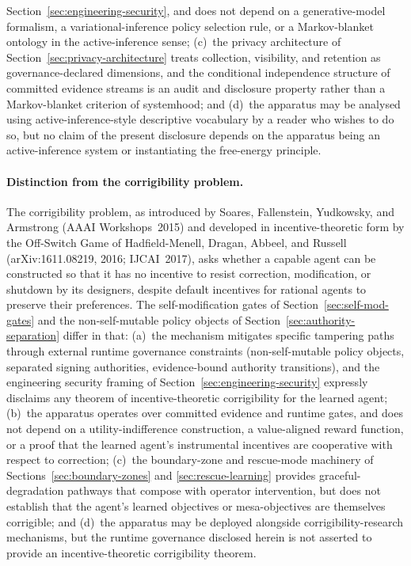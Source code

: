 \documentclass[a4paper,12pt]{article}
\begin{document}
Section~\ref{sec:engineering-security}, and does not depend on a
generative-model formalism, a variational-inference policy
selection rule, or a Markov-blanket ontology in the
active-inference sense; (c)~the privacy architecture of
Section~\ref{sec:privacy-architecture} treats collection,
visibility, and retention as governance-declared dimensions, and
the conditional independence structure of committed evidence
streams is an audit and disclosure property rather than a
Markov-blanket criterion of systemhood; and (d)~the apparatus
may be analysed using active-inference-style descriptive
vocabulary by a reader who wishes to do so, but no claim of the
present disclosure depends on the apparatus being an
active-inference system or instantiating the free-energy
principle.

\paragraph{Distinction from the corrigibility problem.}
The corrigibility problem, as introduced by Soares, Fallenstein,
Yudkowsky, and Armstrong (AAAI Workshops~2015) and developed in
incentive-theoretic form by the Off-Switch Game of
Hadfield-Menell, Dragan, Abbeel, and Russell (arXiv:1611.08219,
2016; IJCAI~2017), asks whether a capable agent can be
constructed so that it has no incentive to resist correction,
modification, or shutdown by its designers, despite default
incentives for rational agents to preserve their preferences.
The self-modification gates of Section~\ref{sec:self-mod-gates}
and the non-self-mutable policy objects of
Section~\ref{sec:authority-separation} differ in that:
(a)~the mechanism mitigates specific tampering paths through
external runtime governance constraints (non-self-mutable policy
objects, separated signing authorities, evidence-bound authority
transitions), and the engineering security framing of
Section~\ref{sec:engineering-security} expressly disclaims any
theorem of incentive-theoretic corrigibility for the learned
agent; (b)~the apparatus operates over committed evidence and
runtime gates, and does not depend on a utility-indifference
construction, a value-aligned reward function, or a proof that
the learned agent's instrumental incentives are cooperative with
respect to correction; (c)~the boundary-zone and rescue-mode
machinery of Sections~\ref{sec:boundary-zones} and
\ref{sec:rescue-learning} provides graceful-degradation pathways
that compose with operator intervention, but does not establish
that the agent's learned objectives or mesa-objectives are
themselves corrigible; and (d)~the apparatus may be deployed
alongside corrigibility-research mechanisms, but the runtime
governance disclosed herein is not asserted to provide an
incentive-theoretic corrigibility theorem.
\end{document}
